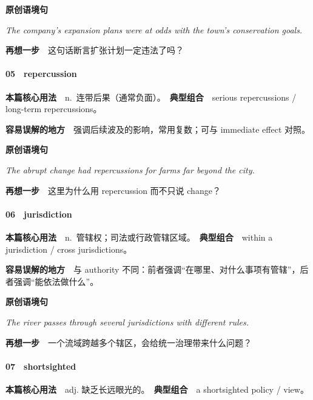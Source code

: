 \documentclass[
  11pt,
]{ctexart}
\renewenvironment{quote}{\begin{tcolorbox}[enhanced,breakable,colback=sand,colframe=primary!22,boxrule=0.4pt,arc=2pt,left=2.6mm,right=2.6mm,top=1.6mm,bottom=1.6mm]\itshape}{\end{tcolorbox}}
\begin{document}
\textbf{原创语境句}

\begin{quote}
The company's expansion plans were at odds with the town's conservation
goals.
\end{quote}

\textbf{再想一步}　这句话断言扩张计划一定违法了吗？

\paragraph{05　repercussion}\label{repercussion}

\textbf{本篇核心用法}　n.~连带后果（通常负面）。　\textbf{典型组合}　serious
repercussions / long-term repercussions。

\textbf{容易误解的地方}　强调后续波及的影响，常用复数；可与 immediate
effect 对照。

\textbf{原创语境句}

\begin{quote}
The abrupt change had repercussions for farms far beyond the city.
\end{quote}

\textbf{再想一步}　这里为什么用 repercussion 而不只说 change？

\paragraph{06　jurisdiction}\label{jurisdiction}

\textbf{本篇核心用法}　n.~管辖权；司法或行政管辖区域。　\textbf{典型组合}　within
a jurisdiction / cross jurisdictions。

\textbf{容易误解的地方}　与 authority
不同：前者强调``在哪里、对什么事项有管辖''，后者强调``能依法做什么''。

\textbf{原创语境句}

\begin{quote}
The river passes through several jurisdictions with different rules.
\end{quote}

\textbf{再想一步}　一个流域跨越多个辖区，会给统一治理带来什么问题？

\paragraph{07　shortsighted}\label{shortsighted}

\textbf{本篇核心用法}　adj. 缺乏长远眼光的。　\textbf{典型组合}　a
shortsighted policy / view。
\end{document}
